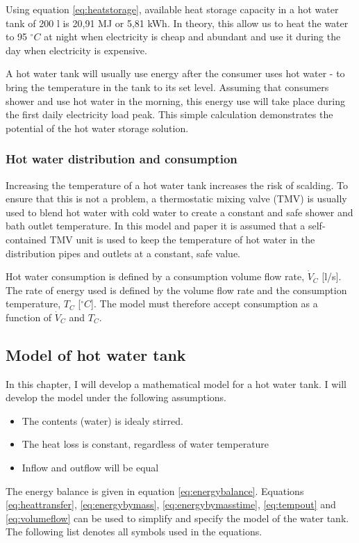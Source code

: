\documentclass[11pt]{article} %
\begin{document}
Using equation \ref{eq:heatstorage}, available heat storage capacity in a hot water tank of 200 l is 20,91 MJ  or 5,81 kWh. In theory, this allow us to heat the water to 95 $^{\circ}C$ at night when electricity is cheap and abundant and use it during the day when electricity is expensive.

A hot water tank will usually use energy after the consumer uses hot water - to bring the temperature in the tank to its set level. Assuming that consumers shower and use hot water in the morning, this energy use will take place during the first daily electricity load peak. This simple calculation demonstrates the potential of the hot water storage solution.

\subsubsection{Hot water distribution and consumption}
Increasing the temperature of a hot water tank increases the risk of scalding. To ensure that this is not a problem, a thermostatic mixing valve (TMV) is usually used to blend hot water with cold water to create a constant and safe shower and bath outlet temperature. In this model and paper it is assumed that a self-contained TMV unit is used to keep the temperature of hot water in the distribution pipes and outlets at a constant, safe value.

Hot water consumption is defined by a consumption volume flow rate, $\dot{V}_C$ [l/s]. The rate of energy used is defined by the volume flow rate and the consumption temperature, $T_C$ [$^{\circ}C$]. The model must therefore accept consumption as a function of $\dot{V} _C$ and $T_C$.

\subsection{Model of hot water tank}
In this chapter, I will develop a mathematical model for a hot water tank. I will develop the model under the following assumptions.

\begin{itemize}
	\item The contents (water) is idealy stirred.
	\item The heat loss is constant, regardless of water temperature
	\item Inflow and outflow will be equal
\end{itemize}

The energy balance is given in equation \ref{eq:energybalance}. Equations \ref{eq:heattransfer}, \ref{eq:energybymass}, \ref{eq:energybymasstime}, \ref{eq:tempout} and \ref{eq:volumeflow} can be used to simplify and specify the model of the water tank. The following list denotes all symbols used in the equations.
\end{document}
